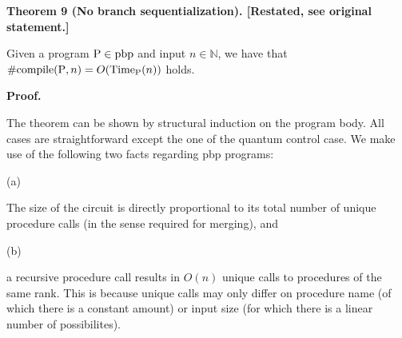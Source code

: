 \documentclass[10pt,a4paper]{amsart}
\begin{document}
 
 
 
\par\medskip\noindent\textbf{Theorem 9 (No branch sequentialization). [Restated, see original statement.]}\par
 
 
Given a program $\mathrm{P}\in\textnormal{{pbp}}{}$ and input $n\in\mathbb{N}$, we have that $\#\textnormal{{{compile}}{}}(\mathrm{P},n)=O(\textnormal{Time}_{\mathrm{P}}(n))$ holds.\par
 
 
 
 
 
 
\par\medskip\noindent\textbf{Proof.}\par
 
 
The theorem can be shown by structural induction on the program body. All cases are straightforward except the one of the quantum control case. We make use of the following two facts regarding pbp programs:\par
  
\par\noindent  (a) 
 
The size of the circuit is directly proportional to its total number of unique procedure calls (in the sense required for merging), and\par
 
 
 
\par\noindent  (b) 
 
a recursive procedure call results in $O(n)$ unique calls to procedures of the same rank. This is because unique calls may only differ on procedure name (of which there is a constant amount) or input size (for which there is a linear number of possibilites).\par
 
 
  
 
\end{document}
